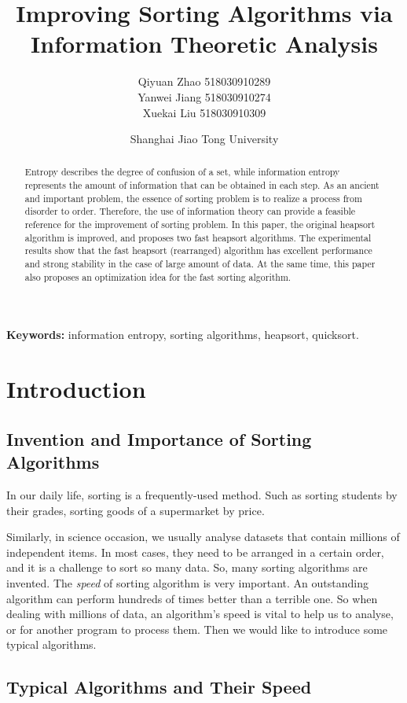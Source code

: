 \documentclass[12pt]{extarticle}
\title{Improving Sorting Algorithms via Information Theoretic Analysis}
\author{Qiyuan Zhao 518030910289\\ Yanwei Jiang 518030910274\\ Xuekai Liu 518030910309}
\date{Shanghai Jiao Tong University}
\newcommand{\<}{\langle}
\renewcommand{\>}{\rangle}
\theoremstyle{definition}
\begin{document}
	
\maketitle

\begin{abstract}
	Entropy describes the degree of confusion of a set, while information entropy represents the amount of information that can be obtained in each step. As an ancient and important problem, the essence of sorting problem is to realize a process from disorder to order. Therefore, the use of information theory can provide a feasible reference for the improvement of sorting problem. In this paper, the original heapsort algorithm is improved, and proposes two fast heapsort algorithms. The experimental results show that the fast heapsort (rearranged) algorithm has excellent performance and strong stability in the case of large amount of data. At the same time, this paper also proposes an optimization idea for the fast sorting algorithm.
\end{abstract}

\textbf{Keywords: } information entropy, sorting algorithms, heapsort, quicksort.

\newpage
\tableofcontents

\section{Introduction}

\subsection{Invention and Importance of Sorting Algorithms}

In our daily life, sorting is a frequently-used method. Such as sorting students by their grades, sorting goods of a supermarket by price.

Similarly, in science occasion, we usually analyse datasets that contain millions of independent items. In most cases, they need to be arranged in a certain order, and it is a challenge to sort so many data. So, many sorting algorithms are invented. The \textit{speed} of sorting algorithm is very important. An outstanding algorithm can perform hundreds of times better than a terrible one. So when dealing with millions of data, an algorithm's speed is vital to help us to analyse, or for another program to process them. Then we would like to introduce some typical algorithms.

\subsection{Typical Algorithms and Their Speed}
\end{document}
